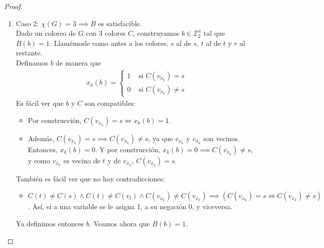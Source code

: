 \begin{proof}
\begin{enumerate}
\begin{align}
\begin{array}{cc}
        \end{array}
    \right.
    \end{align}
    Aquí coloreamos $g_{ij}$ con el color $t$, si $j = j_i$. A los otros dos $g_{ij}$'s, los coloreamos con $r$ a uno y con $s$ al otro. Es entonces claro que el [triangulito] $g_{i1}g_{i2},g_{i2}g_{i3},g_{i3}g_{i1}$ no causa problemas.\\
    Además, dado un lado $p_{ij}g_{ij}$:
    \begin{itemize}
        \item Si $j = j_i$, $C(p_{ij}) = r$, pero $C(g_{ij}) = t$.
        \item Si $j \neq j_i$, $C(p_{ij}) = t$, pero $C(g_{ij}) = r,s$.
    \end{itemize}
    Dimos un coloreo propio de $G$ con 3 colores. Es decir, $G$ es 3-coloreable.
    
    \item Caso 2: $\chi(G) = 3 \implies B$ es satisfacible.\\
    Dado un coloreo de G con 3 colores $C$, construyamos $b \in \mathbb{Z}_2^n$ tal que $B(b) = 1$. Llamémosle como antes a los colores: $s$ al de $s$, $t$ al de $t$ y $r$ al restante.\\
    Definamos $b$ de manera que
    \begin{align}
        x_k(b) =
        \left\{
        \begin{array}{cc}
        1 & \text{ si } C(v_{x_k}) = s\\
        0 & \text{ si } C(v_{x_k}) \neq s
        \end{array}
        \right.
    \end{align}
    Es fácil ver que $b$ y $C$ son compatibles:
    \begin{itemize}
        \item Por construcción, $C(v_{x_k}) = s \iff x_k(b) = 1$.
        \item Además, $C(v_{\overline{x}_k}) = s \implies C(v_{x_k}) \neq s$, ya que $v_{x_k}$ y $v_{\overline{x}_k}$ son vecinos. Entonces, $x_k(b) = 0$. Y por construcción, $x_k(b) = 0 \implies C(v_{x_k}) \neq s$, y como $v_{\overline{x}_k}$ es vecino de $t$ y de $v_{x_k}$, $C(v_{\overline{x}_k}) = s$.
    \end{itemize}
    También es fácil ver que no hay contradicciones:
    \begin{itemize}
        \item $C(t) \neq C(s) \wedge C(t) \neq C(v_l) \wedge C(v_{x_k}) \neq C(v_{\overline{x}_k}) \implies (C(v_{x_k}) = s \iff C(v_{\overline{x}_k}) \neq s)$. Así, si a una variable se le asigna 1, a su negación 0, y viceversa.
    \end{itemize}
    Ya definimos entonces $b$. Veamos ahora que $B(b) = 1$.\\
    

\end{enumerate}
\end{proof}
